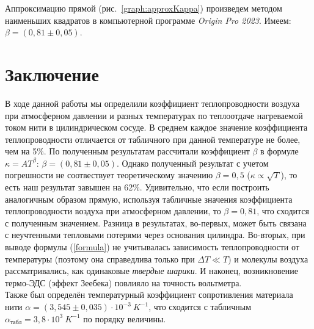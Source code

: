 \documentclass[a4paper, 12pt]{article}
\begin{document}
        \noindent Аппроксимацию прямой (рис.~\ref{graph:approxKappa}) произведем методом наименьших квадратов в компьютерной программе \textit{Origin Pro 2023}. Имеем: $\beta = \left(0,81 \pm 0,05\right)$.

    \section*{Заключение}
        
        \noindent В ходе данной работы мы определили коэффициент теплопроводности воздуха при атмосферном давлении и разных температурах по теплоотдаче нагреваемой током нити в цилиндрическом сосуде. В среднем каждое значение коэффициента теплопроводности отличается от табличного при данной температуре не более, чем на 5\%. По полученным результатам рассчитали коэффициент $\beta$ в формуле $\kappa = AT^\beta$: $\beta = \left(0,81 \pm 0,05\right)$. Однако полученный результат с учетом погрешности не соотвествует теоретическому значению $\beta = 0,5$ ($\kappa \propto \sqrt{T}$), то есть наш результат завышен на 62\%. Удивительно, что если построить аналогичным образом прямую, используя табличные значения коэффициента теплопроводности воздуха при атмосферном давлении, то $\beta = 0,81$, что сходится с полученным значением. Разница в результатах, во-первых, может быть связана с неучтенными тепловыми потерями через основания цилиндра. Во-вторых, при выводе формулы (\ref{formula}) не учитывалась зависимость теплопроводности от температуры (поэтому она справедлива только при $\Delta T \ll T$) и молекулы воздуха рассматривались, как одинаковые \textit{твердые шарики}. И наконец, возникновение термо-ЭДС (эффект Зеебека) повлияло на точность вольтметра.\\

        \noindent Также был определён температурный коэффициент сопротивления материала нити $\alpha = \left( 3,545 \pm 0,035\right) \cdot 10^{-3} \: K^{-1}$, что сходится с табличным $\alpha_{\text{табл}} = 3,8 \cdot 10^{3} \: K^{-1}$ по порядку величины.
\end{document}
